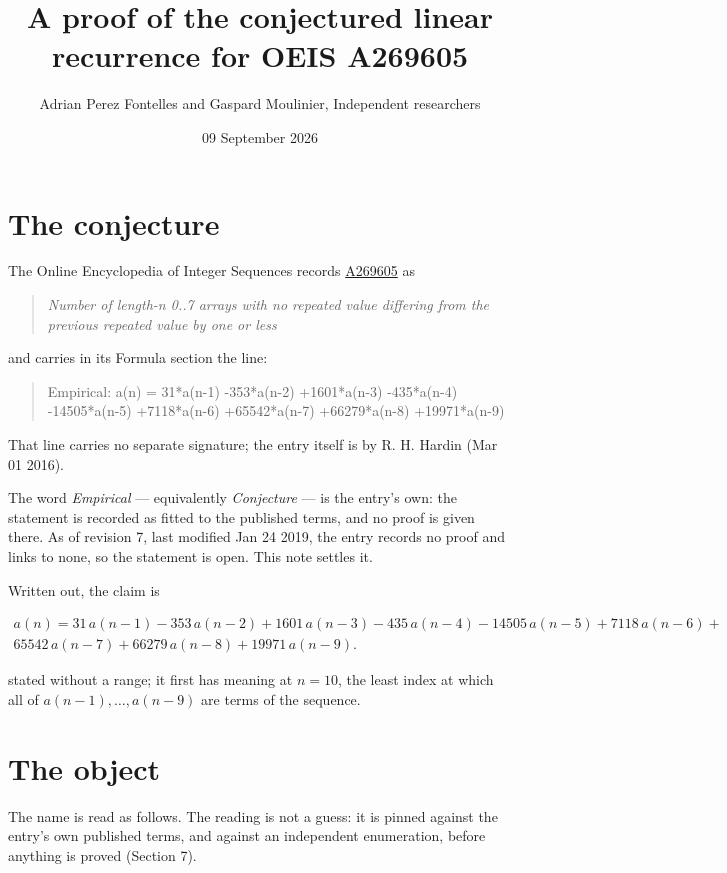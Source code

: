 \documentclass[11pt]{article}
\title{A proof of the conjectured linear recurrence for OEIS A269605}
\author{Adrian Perez Fontelles and Gaspard Moulinier, Independent researchers}
\date{09 September 2026}
\theoremstyle{definition}
\begin{document}
\maketitle
\section{The conjecture}

The Online Encyclopedia of Integer Sequences records \href{https://oeis.org/A269605}{A269605} as

\begin{quote}\itshape Number of length-n 0..7 arrays with no repeated value differing from the previous repeated value by one or less\end{quote}

and carries in its Formula section the line:

\begin{quote}\ttfamily Empirical: a(n) = 31*a(n-1) -353*a(n-2) +1601*a(n-3) -435*a(n-4) -14505*a(n-5) +7118*a(n-6) +65542*a(n-7) +66279*a(n-8) +19971*a(n-9)\end{quote}

That line carries no separate signature; the entry itself is by R. H. Hardin (Mar 01 2016).

The word {\itshape Empirical} --- equivalently {\itshape Conjecture} --- is the entry's own: the statement is recorded as fitted to the published terms, and no proof is given there. As of revision 7, last modified Jan 24 2019, the entry records no proof and links to none, so the statement is open. This note settles it.

Written out, the claim is

\begin{multline*} a(n) = 31\,a(n-1) - 353\,a(n-2) + 1601\,a(n-3) - 435\,a(n-4) - 14505\,a(n-5) + 7118\,a(n-6) + \\ 65542\,a(n-7) + 66279\,a(n-8) + 19971\,a(n-9). \end{multline*}

stated without a range; it first has meaning at $n = 10$, the least index at which all of $a(n-1),\dots,a(n-9)$ are terms of the sequence.

\section{The object}

The name is read as follows. The reading is not a guess: it is pinned against the entry's own published terms, and against an independent enumeration, before anything is proved (Section 7).
\end{document}
